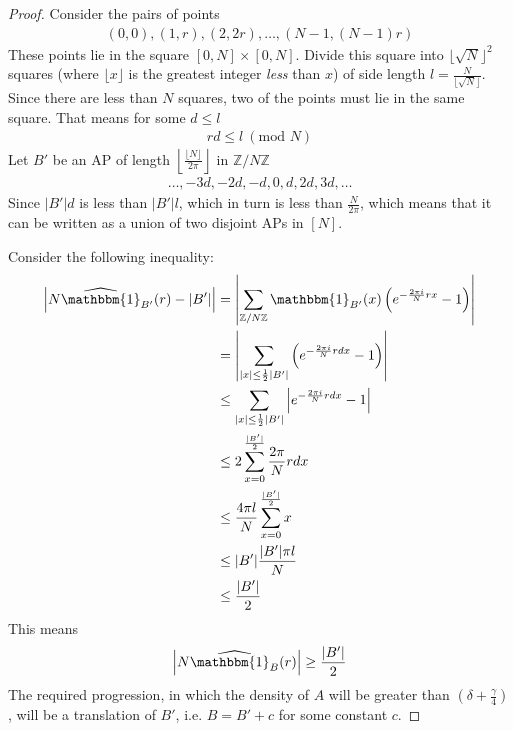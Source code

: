 \documentclass[12pt]{article}
\theoremstyle{definition}
\newcommand{\znz}{\mathbb{Z}/N\mathbb{Z}}
\newcommand{\indi}{\mathbbm{1}}
\begin{document}
\begin{proof}
    Consider the pairs of points
    \begin{align*}
        (0, 0), (1, r), (2, 2r), \ldots, (N-1, (N-1)r)
    \end{align*}
    These points lie in the square $[0, N] \times [0, N]$. Divide this square into $\lfloor \sqrt{N} \rfloor^2$ squares (where $\lfloor x \rfloor$ is the greatest integer \emph{less} than $x$) of side length $l = \frac{N}{\lfloor \sqrt{N} \rfloor}$. Since there are less than $N$ squares, two of the points must lie in the same square. That means for some $d \leq l$
    \begin{align*}
        rd \leq l\ (\text{mod } N)
    \end{align*}
    Let $B'$ be an AP of length $ \left\lfloor \frac{\lfloor N \rfloor}{2\pi} \right\rfloor$ in $\znz$
    \begin{align*}
        \ldots , -3d, -2d, -d, 0, d, 2d, 3d, \ldots
    \end{align*}
    Since $|B'|d$ is less than $|B'|l$, which in turn is less than $\frac{N}{2\pi}$, which means that it can be written as a union of two disjoint APs in $[N]$.

    Consider the following inequality:
    \begin{align*}
        \left|N \widehat{\indi}_{B'}(r)  - |B'|\right| &= \left| \sum_{\znz} \indi_{B'}(x)\left(e^{-\frac{2\pi i}{N}rx} - 1 \right) \right| \\
        &= \left| \sum_{|x| \leq \frac{1}{2} |B'|} \left(e^{-\frac{2\pi i}{N}rdx} - 1 \right) \right| \\
        &\leq \sum_{|x| \leq \frac{1}{2} |B'|} \left| e^{-\frac{2\pi i}{N}rdx} - 1 \right| \\
        &\leq 2 \sum_{x=0}^{\frac{|B'|}{2}} \frac{2\pi}{N} rdx \\
        &\leq \frac{4\pi l}{N} \sum_{x=0}^{\frac{|B'|}{2}} x \\
        &\leq |B'| \frac{|B'| \pi l}{N} \\
        &\leq \frac{|B'|}{2}
    \end{align*}
    This means
    \begin{align*}
        \left|N \widehat{\indi_B}(r) \right| \geq \frac{|B'|}{2}
    \end{align*}
    The required progression, in which the density of $A$ will be greater than $\left( \delta + \frac{\gamma}{4} \right)$, will be a translation of $B'$, i.e. $B = B' + c$ for some constant $c$.
    

\end{proof}
\end{document}
